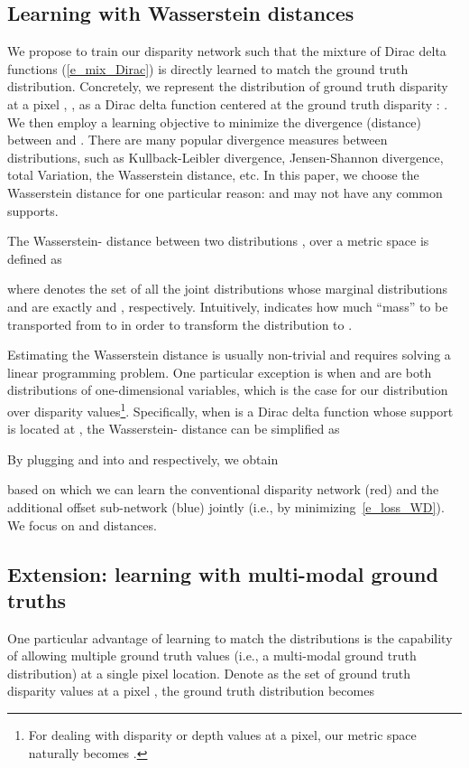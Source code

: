\documentclass{article}
\newcommand{\ie}{i.e.\xspace}
\begin{document}
\subsection{Learning with Wasserstein distances}
\label{ssec:LWWD}
We propose to train our disparity network such that the mixture of Dirac delta functions (\autoref{e_mix_Dirac}) is directly learned to match the ground truth distribution. Concretely,
we represent the distribution of ground truth disparity at a pixel , , as a Dirac delta function centered at the ground truth disparity  : . We then employ a learning objective to minimize the divergence (distance) between  and . There are many popular divergence measures between distributions, such as Kullback-Leibler divergence, Jensen-Shannon divergence, total Variation, the Wasserstein distance, etc. In this paper, we choose the Wasserstein distance for one particular reason:  and  may not have any common supports.

The Wasserstein- distance between two distributions ,  over a metric space  is defined as

where  denotes the set of all the joint distributions  whose marginal distributions   and  are exactly  and , respectively. Intuitively,  indicates how much ``mass'' to be transported from  to  in order to transform the distribution  to .

Estimating the Wasserstein distance is usually non-trivial and requires solving a linear programming problem. One particular exception is when  and  are both distributions of one-dimensional variables, which is the case for our distribution over disparity values\footnote{For dealing with disparity or depth values at a pixel, our metric space naturally becomes .}. 
Specifically, when  is a Dirac delta function whose support is located at , the Wasserstein- distance can be simplified as

By plugging  and  into  and  respectively, we obtain

based on which we can learn the conventional disparity network ({\color{red}red}) and the additional offset sub-network ({\color{blue}blue}) jointly (\ie, by minimizing~\autoref{e_loss_WD}). We focus on  and  distances.


\subsection{Extension: learning with multi-modal ground truths}
\label{sec:mm-ext}

One particular advantage of learning to match the distributions is the capability of allowing multiple ground truth values (\ie, a multi-modal ground truth distribution) at a single pixel location.
Denote  as the set of ground truth disparity values at a pixel , the ground truth distribution becomes
\end{document}
